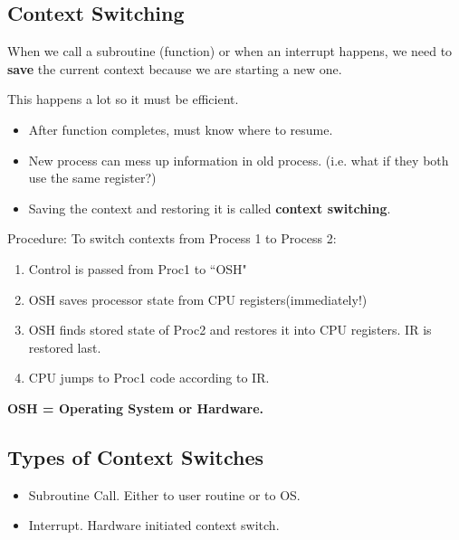 \subsection{Context Switching}

When we call a subroutine (function) or when an
interrupt happens, we need to {\bf save} the current context
because we are starting a new one.

This happens a lot so it must be efficient.


\begin{itemize}
         \item After function completes, must know where to resume.
         \item New process can mess up information in old process.
        (i.e. what if they both use the same register?)
        \item Saving the context and restoring it is called
        {\bf context switching}.
\end{itemize}



Procedure: To switch contexts from Process 1 to Process 2:
\begin{enumerate}
\item Control is passed from Proc1 to ``OSH"
\item OSH saves processor state from CPU registers(immediately!)
\item OSH finds stored state of Proc2 and restores it
into CPU registers.  IR is restored last.
\item CPU jumps to Proc1 code according to IR.
\end{enumerate}
{\bf OSH = Operating System or Hardware.}


\subsection{Types of Context Switches}

\begin{itemize}
\item Subroutine Call. Either to user routine or to OS.
\item Interrupt.  Hardware initiated context switch.
\end{itemize}



